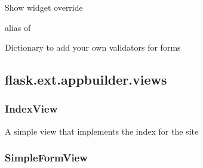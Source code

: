 \documentclass[letterpaper,10pt,english]{sphinxmanual}
\begin{document}
\begin{fulllineitems}

\begin{fulllineitems}
\label{api:flask.ext.appbuilder.baseviews.BaseCRUDView.show_widget}
Show widget override

alias of 

\end{fulllineitems}


\begin{fulllineitems}
\label{api:flask.ext.appbuilder.baseviews.BaseCRUDView.validators_columns}
Dictionary to add your own validators for forms

\end{fulllineitems}


\end{fulllineitems}



\subsection{flask.ext.appbuilder.views}
\label{api:flask-ext-appbuilder-views}\label{api:module-flask.ext.appbuilder.views}

\subsubsection{IndexView}
\label{api:indexview}

\begin{fulllineitems}
\label{api:flask.ext.appbuilder.views.IndexView}
A simple view that implements the index for the site

\end{fulllineitems}



\subsubsection{SimpleFormView}
\label{api:simpleformview}
\end{document}
